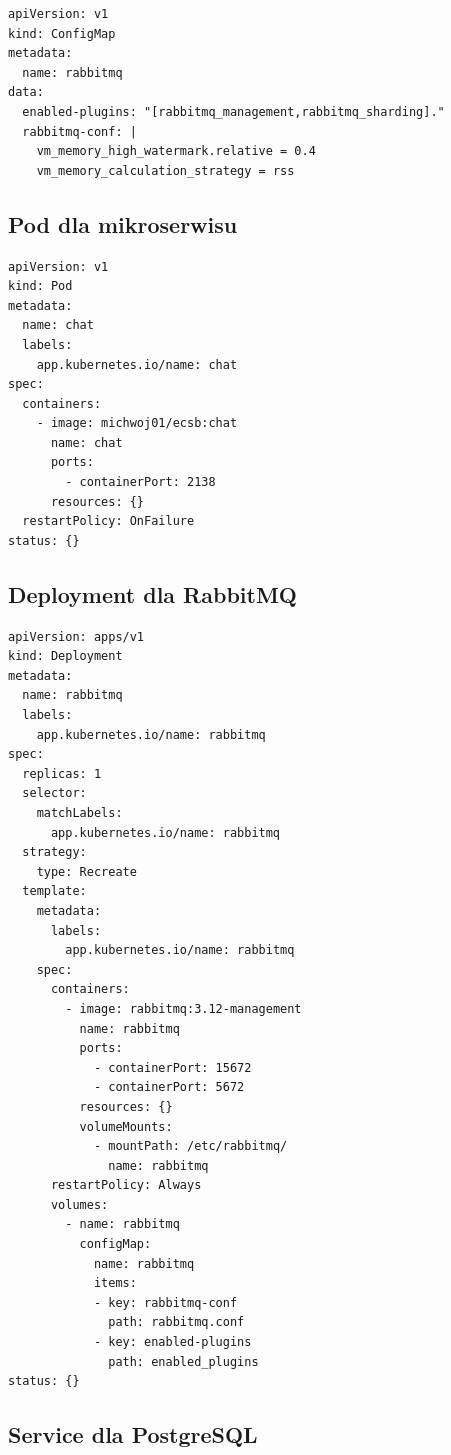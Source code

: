\documentclass[polish]{aghengthesis}
\begin{document}
\begin{lstlisting}[caption=ConfigMap dla RabbitMQ]
apiVersion: v1
kind: ConfigMap
metadata:
  name: rabbitmq
data:
  enabled-plugins: "[rabbitmq_management,rabbitmq_sharding]."
  rabbitmq-conf: |
    vm_memory_high_watermark.relative = 0.4
    vm_memory_calculation_strategy = rss
\end{lstlisting}

\subsection{Pod dla mikroserwisu}

\begin{lstlisting}[caption=Pod dla mikroserwisu]
apiVersion: v1
kind: Pod
metadata:
  name: chat
  labels:
    app.kubernetes.io/name: chat
spec:
  containers:
    - image: michwoj01/ecsb:chat
      name: chat
      ports:
        - containerPort: 2138
      resources: {}
  restartPolicy: OnFailure
status: {}
\end{lstlisting}

\subsection{Deployment dla RabbitMQ}

\begin{lstlisting}[caption=Deployment dla RabbitMQ]
apiVersion: apps/v1
kind: Deployment
metadata:
  name: rabbitmq
  labels:
    app.kubernetes.io/name: rabbitmq
spec:
  replicas: 1
  selector:
    matchLabels:
      app.kubernetes.io/name: rabbitmq
  strategy:
    type: Recreate
  template:
    metadata: 
      labels:
        app.kubernetes.io/name: rabbitmq
    spec:
      containers:
        - image: rabbitmq:3.12-management
          name: rabbitmq
          ports:
            - containerPort: 15672
            - containerPort: 5672
          resources: {}
          volumeMounts:
            - mountPath: /etc/rabbitmq/
              name: rabbitmq
      restartPolicy: Always
      volumes:
        - name: rabbitmq
          configMap:
            name: rabbitmq
            items:
            - key: rabbitmq-conf
              path: rabbitmq.conf
            - key: enabled-plugins
              path: enabled_plugins
status: {}
\end{lstlisting}

\subsection{Service dla PostgreSQL}
\end{document}
